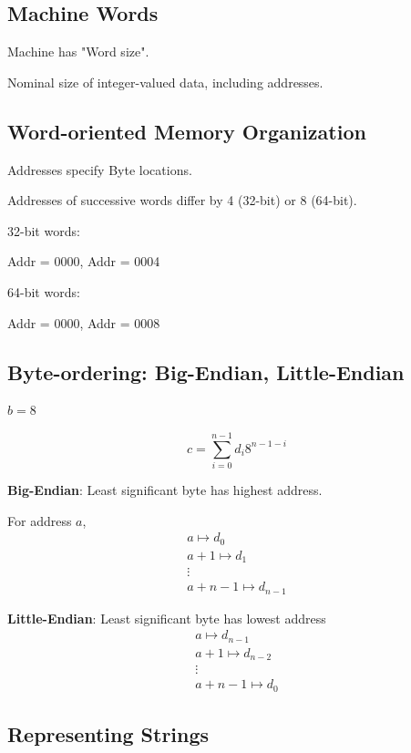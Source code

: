 \documentclass[10pt]{amsart}
\begin{document}
\subsection{Machine Words}

Machine has "Word size".

Nominal size of integer-valued data, including addresses.

\subsection{Word-oriented Memory Organization}

Addresses specify Byte locations. 

Addresses of successive words differ by 4 (32-bit) or 8 (64-bit).

32-bit words:

Addr = 0000, Addr = 0004

64-bit words:

Addr = 0000, Addr = 0008

\subsection{Byte-ordering: Big-Endian, Little-Endian}

$b = 8$

\begin{equation}
c = \sum_{i=0}^{n-1} d_i 8^{n-1 -i}
\end{equation}

\textbf{Big-Endian}: Least significant byte has highest address.

For address $a$, 
\[
\begin{gathered}
a \mapsto d_0 \\
a+1 \mapsto d_1 \\
\vdots \\
a+n-1 \mapsto d_{n-1}
\end{gathered}
\]

\textbf{Little-Endian}: Least significant byte has lowest address
\[
\begin{gathered}
a \mapsto d_{n-1}  \\
a+1 \mapsto d_{n-2} \\
\vdots \\
a+n -1 \mapsto d_0
\end{gathered}
\]

\subsection{Representing Strings}
\end{document}
